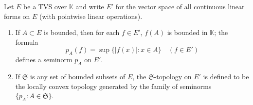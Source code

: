 Let $E$ be a TVS over $\mathbb{K}$ and write $E'$ for the vector space of all continuous linear forms on $E$ (with pointwise linear operations).
\begin{enumerate}
\item[(i)] If $A \subset E$ is bounded, then for each $f \in E'$, $f(A)$ is bounded in $\mathbb{K}$; the formula
$$p_A(f) = \sup \{|f(x)| : x \in A\} \quad (f \in E')$$
defines a seminorm $p_A$ on $E'$.
\item[(ii)] If $\mathfrak{S}$ is any set of bounded subsets of $E$, the $\mathfrak{S}$-topology on $E'$ is defined to be the locally convex topology generated by the family of seminorms $\{p_A : A \in \mathfrak{S}\}$.
\end{enumerate}
